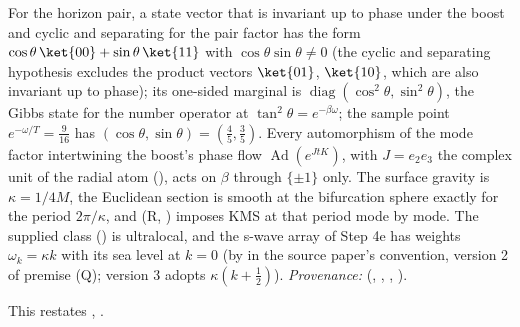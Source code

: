 For the horizon pair, a state vector that is invariant up to phase under the boost and cyclic and separating for the pair factor has the form $\cos\theta\,\ket{00} + \sin\theta\,\ket{11}$ with $\cos\theta\sin\theta \neq 0$ (the cyclic and separating hypothesis excludes the product vectors $\ket{01}$, $\ket{10}$, which are also invariant up to phase); its one-sided marginal is $\operatorname{diag}(\cos^{2}\theta, \sin^{2}\theta)$, the Gibbs state for the number operator at $\tan^{2}\theta = e^{-\beta\omega}$; the sample point $e^{-\omega/T} = \tfrac{9}{16}$ has $(\cos\theta, \sin\theta) = (\tfrac45, \tfrac35)$. Every automorphism of the mode factor intertwining the boost's phase flow $\operatorname{Ad}(e^{JtK})$, with $J = e_{2}e_{3}$ the complex unit of the radial atom (), acts on $\beta$ through $\{\pm 1\}$ only. The surface gravity is $\kappa = 1/4M$, the Euclidean section is smooth at the bifurcation sphere exactly for the period $2\pi/\kappa$, and (R, ) imposes KMS at that period mode by mode. The supplied class () is ultralocal, and the s-wave array of Step 4e has weights $\omega_{k} = \kappa k$ with its sea level at $k = 0$ (by  in the source paper's convention, version 2 of premise (Q); version 3 adopts $\kappa(k + \tfrac12)$). \emph{Provenance:} \cite[Lem.~7.2, Thm.~7.3, Thm.~7.16, Prop.~7.18, Prem.~7.19, Prop.~7.25, Rem.~7.26, Prem.~7.30, Rem.~7.33, Prem.~8.1, Thm.~C.8, Rem.~C.9, Prop.~A.2]{ButlerT5} (, , , ).

This restates , .

